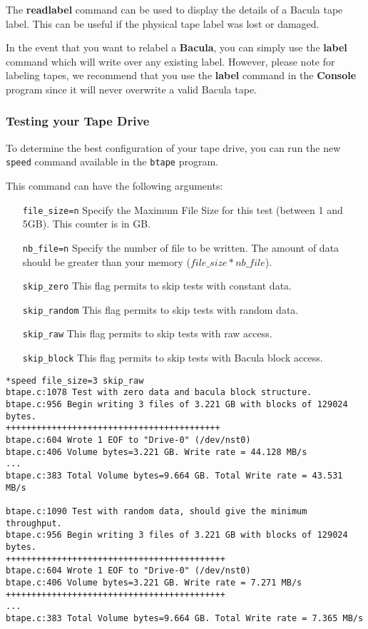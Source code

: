 The {\bf readlabel} command can be used to display the details of a Bacula
tape label. This can be useful if the physical tape label was lost or damaged.


In the event that you want to relabel a {\bf Bacula}, you can simply use the
{\bf label} command which will write over any existing label. However, please
note for labeling tapes, we recommend that you use the {\bf label} command in
the {\bf Console} program since it will never overwrite a valid Bacula tape. 

\subsubsection*{Testing your Tape Drive}
\label{sec:btapespeed}

To determine the best configuration of your tape drive, you can run the new
\texttt{speed} command available in the \texttt{btape} program.

This command can have the following arguments:
\begin{itemize}
\item[\texttt{file\_size=n}] Specify the Maximum File Size for this test
  (between 1 and 5GB). This counter is in GB.
\item[\texttt{nb\_file=n}] Specify the number of file to be written. The amount
  of data should be greater than your memory ($file\_size*nb\_file$).
\item[\texttt{skip\_zero}] This flag permits to skip tests with constant
  data.
\item[\texttt{skip\_random}] This flag permits to skip tests with random
  data.
\item[\texttt{skip\_raw}] This flag permits to skip tests with raw access.
\item[\texttt{skip\_block}] This flag permits to skip tests with Bacula block
  access.
\end{itemize}

\begin{verbatim}
*speed file_size=3 skip_raw
btape.c:1078 Test with zero data and bacula block structure.
btape.c:956 Begin writing 3 files of 3.221 GB with blocks of 129024 bytes.
++++++++++++++++++++++++++++++++++++++++++
btape.c:604 Wrote 1 EOF to "Drive-0" (/dev/nst0)
btape.c:406 Volume bytes=3.221 GB. Write rate = 44.128 MB/s
...
btape.c:383 Total Volume bytes=9.664 GB. Total Write rate = 43.531 MB/s

btape.c:1090 Test with random data, should give the minimum throughput.
btape.c:956 Begin writing 3 files of 3.221 GB with blocks of 129024 bytes.
+++++++++++++++++++++++++++++++++++++++++++
btape.c:604 Wrote 1 EOF to "Drive-0" (/dev/nst0)
btape.c:406 Volume bytes=3.221 GB. Write rate = 7.271 MB/s
+++++++++++++++++++++++++++++++++++++++++++
...
btape.c:383 Total Volume bytes=9.664 GB. Total Write rate = 7.365 MB/s

\end{verbatim}

